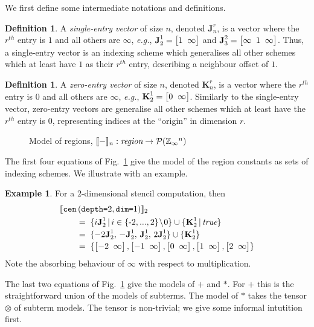 \documentclass[9pt]{sigplanconf}
\newcounter{block}
\theoremstyle{definition}
\newtheorem{example}[block]{Example}
\newtheorem{definition}[block]{Definition}
\newcommand{\eg}{\emph{e.g.}}
\newcommand{\interp}[1]{\llbracket{#1}\rrbracket}
\newcommand{\term}[1]{\texttt{#1}}
\newcommand{\stenCenS}[2]{\term{cen} \, (\term{depth=}#1,
  \term{dim=}#2)}
\newcommand{\vtwoh}[2]{\setlength{\arraycolsep}{0em}
\left[\begin{array}{cc}#1 \; & \; #2\end{array}\right]}
\newcommand{\vthreeh}[3]{\setlength{\arraycolsep}{0em}
\left[\begin{array}{ccc}#1 \; & \; #2 \; & \; #3\end{array}\right]}
\newcommand{\singleEntry}[2]{\textbf{J}_{#2}^{#1}}
\newcommand{\zeroEntry}[2]{\textbf{K}_{#2}^{#1}}
\begin{document}
We first define some intermediate notations and definitions.

\begin{definition}A \emph{single-entry vector} of size $n$, denoted
$\singleEntry{r}{n}$, is a vector where the $r^{th}$ entry is $1$
and all others are $\infty$, \eg{}, $\singleEntry{1}{2} =
\vtwoh{1}{\infty}$ and $\singleEntry{2}{3} = \vthreeh{\infty}{1}{\infty}$.
Thus, a single-entry vector is an indexing scheme which generalises
all other schemes which at least have $1$ as their $r^{th}$ entry,
describing a neighbour offset of $1$.
\end{definition}

\begin{definition}A \emph{zero-entry vector} of size $n$, denoted
$\zeroEntry{r}{n}$, is a vector where the $r^{th}$ entry is $0$ and all others
are $\infty$, \eg{}, $\zeroEntry{1}{2} = \vtwoh{0}{\infty}$.
Similarly to the single-entry vector, zero-entry vectors
are generalise all other schemes
which at least have the $r^{th}$ entry is $0$, representing indices at
the ``origin'' in dimension $r$.
\end{definition}

\begin{figure}[t]
\vspace{-0.9em}

\caption{Model of regions,
$\interp{-}_n : \textit{region} \rightarrow \mathcal{P}(\domainVal{}^n)$}
\label{fig:region-model}
\vspace{-0.7em}
\end{figure}

\noindent
The first four equations of Fig.~\ref{fig:region-model}
give the model of the region constants as sets of indexing
schemes. We illustrate with an example.

\begin{example}
For a $2$-dimensional stencil computation, then
\begin{align*}
& \interp{\stenCenS{2}{1}}_2 \\[-0.1em]
& \qquad = \; \{i\singleEntry{1}{2} \,|\, i \in \{\text{-}2,..., 2\}\!\setminus\!0 \}
  \cup  \{ \zeroEntry{1}{2} \,|\, \textit{true} \} \\[-0.2em]
& \qquad = \; \{-2\singleEntry{1}{2}, \, -\singleEntry{1}{2}, \,
  \singleEntry{1}{2}, \, 2\singleEntry{1}{2}\} \cup
  \{\zeroEntry{1}{2}\} \\[-0.2em]
& \qquad = \; \{\vtwoh{-2}{\infty}, \vtwoh{-1}{\infty}, \vtwoh{0}{\infty},
\vtwoh{1}{\infty}, \vtwoh{2}{\infty}\}
\end{align*}
Note the absorbing behaviour of $\infty$ with respect to
multiplication.
\end{example}
\noindent
The last two equations of Fig.~\ref{fig:region-model} give the
models of $\term{+}$ and $\term{*}$. For $\term{+}$ this is the 
straightforward union of the models of subterms. The model of
$\term{*}$ takes the tensor $\otimes$ of subterm models. The tensor is
non-trivial; we give some informal intutition first. 
\end{document}
